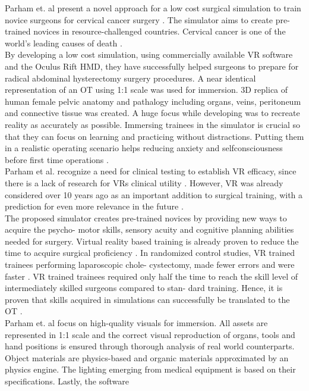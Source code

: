 Parham et. al present a novel approach for a low cost surgical simulation to train novice
surgeons for cervical cancer surgery \cite{Parham.2019}. The simulator aims to create pre-trained novices
in resource-challenged countries. Cervical cancer is one of the world’s leading causes of
death \cite{Parham.2019}.
\\ By developing a low cost simulation, using commercially available VR software and the
Oculus Rift HMD, they have successfully helped surgeons to prepare for radical abdominal
hysterectomy surgery procedures. A near identical representation of an OT
using 1:1 scale was used for immersion. 3D replica of human female pelvic anatomy and
pathalogy including organs, veins, peritoneum and connective tissue was created. A
huge focus while developing was to recreate reality as accurately as possible.
Immersing trainees in the simulator is crucial so that they can focus on learning and practicing without
distractions. Putting them in a realistic operating scenario helps reducing anxiety and
selfconsciousness before first time operations \cite{Parham.2019}.
\\ Parham et al. recognize a need for clinical testing to establish VR efficacy, since there is
a lack of research for VRs clinical utility \cite{RN59}. However, VR was already considered over
10 years ago as an important addition to surgical training, with a prediction for even
more relevance in the future \cite{RN60}.
\\ The proposed simulator creates pre-trained novices by providing new ways to acquire the psycho-
motor skills, sensory acuity and cognitive planning abilities needed for surgery. Virtual
reality based training is already proven to reduce the time to acquire surgical proficiency
\cite{RN61,RN62}. In randomized control studies, VR trained trainees performing laparoscopic chole-
cystectomy, made fewer errors and were faster \cite{RN63,RN64}. VR trained trainees required only
half the time to reach the skill level of intermediately skilled surgeons compared to stan-
dard training. Hence, it is proven that skills acquired in simulations can successfully be
translated to the OT \cite{RN63,RN64}.
\\ Parham et. al focus on high-quality visuals for immersion. All assets are represented
in 1:1 scale and the correct visual reproduction of organs, tools and hand positions is
ensured through thorough analysis of real world counterparts. Object materials are
physics-based and organic materials approximated by an physics engine. The lighting
emerging from medical equipment is based on their specifications. Lastly, the software
